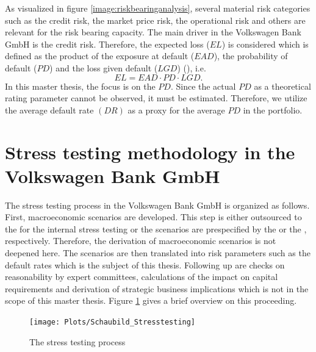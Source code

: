 \documentclass[a4paper, 11pt]{scrreprt}
\begin{document}
As visualized in figure \ref{image:riskbearinganalysis}, several material risk categories such as the credit risk, the market price risk, the operational risk and others are relevant for the risk bearing capacity. The main driver in the Volkswagen Bank GmbH is the credit risk. Therefore, the expected loss ($EL$) is considered which is defined as the product of the exposure at default ($EAD$), the probability of default ($PD$) and the loss given default ($LGD$) (\textcite[p. 188]{engelmann2011baselii}), i.e.
\begin{equation}\label{EL}
EL = EAD \cdot PD \cdot LGD.
\end{equation}
In this master thesis, the focus is on the $PD$. Since the actual $PD$ as a theoretical rating parameter cannot be observed, it must be estimated. Therefore, we utilize the average default rate $(DR)$ as a proxy for the average $PD$ in the portfolio.

\bigskip

\section{Stress testing methodology in the Volkswagen Bank GmbH}

The stress testing process in the Volkswagen Bank GmbH is organized as follows. First, macroeconomic scenarios are developed. This step is either outsourced to the \textcite{iwh2017scenario} for the internal stress testing or the scenarios are prespecified by the \textcite{eba2018stresstest} or the \textcite{ecb2018srep}, respectively. Therefore, the derivation of macroeconomic scenarios is not deepened here. 
The scenarios are then translated into risk parameters such as the default rates which is the subject of this thesis. Following up are checks on reasonability by expert committees, calculations of the impact on capital requirements and derivation of strategic business implications which is not in the scope of this master thesis. Figure \ref{image:stresstesting} gives a brief overview on this proceeding.

\begin{figure}[H]
	\centering
	\texttt{[image: Plots/Schaubild\_Stresstesting]}
	\caption{The stress testing process}
	\label{image:stresstesting}
\end{figure}
\end{document}
